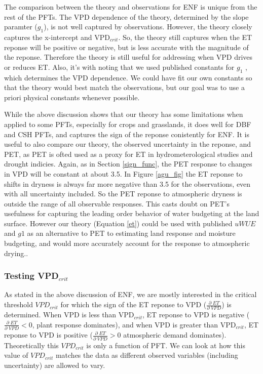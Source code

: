 \documentclass[draft,linenumbers]{agujournal}
\begin{document}
The comparison between the theory and observations for ENF is unique from the rest of the PFTs. The VPD dependence of the theory, determined by the slope paramter ($g_1$), is not well captured by observations. However, the theory closely captures the x-intercept and VPD$_{crit}$. So, the theory still captures when the ET reponse will be positive or negative, but is less accurate with the magnitude of the reponse. Therefore the theory is still useful for addressing when VPD drives or reduces ET. Also, it's with noting that we used published constants for $g_1$ \citep[from ][]{Lin_2015}, which determines the VPD dependence. We could have fit our own constants so that the theory would best match the observations, but our goal was to use a priori physical constants whenever possible.

While the above discussion shows that our theory has some limitations when applied to some PFTs, especially for crops and grasslands, it does well for DBF and CSH PFTs, and captures the sign of the reponse conistently for ENF. It is useful to also compare our theory, the observed uncertainty in the reponse, and PET, as PET is ofted used as a proxy for ET in hydrometerological studies and drought indicies.  Again, as in Section \ref{sign_func}, the PET response to changes in VPD will be constant at about 3.5. In Figure \ref{agu_fig} the ET reponse to shifts in dryness is always far more negative than 3.5 for the observations, even with all uncertainty included. So the PET reponse to atmospheric dryness is outside the range of all observable responses. This casts doubt on PET's usefulness for capturing the leading order behavior of water budgeting at the land surface. However our theory (Equation \ref{et}) could be used with published $uWUE$ and $g1$ as an alternative to PET to estimating land response and moisture budgeting, and would more accurately account for the response to atmospheric drying..

\subsubsection{Testing VPD$_{crit}$}
As stated in the above discussion of ENF, we are mostly interested in the critical threshold $VPD_{crit}$ for which the sign of the ET reponse to VPD ($\frac{\partial \; ET}{\partial \; VPD}$) is determined. When VPD is less than VPD$_{crit}$, ET reponse to VPD is negative ($\frac{\partial \; ET}{\partial \; VPD}  < 0$, plant response dominates), and when VPD is greater than VPD$_{crit}$, ET reponse to VPD is positive  ($\frac{\partial \; ET}{\partial \; VPD} > 0$ atmospheric demand dominates). Theoretically this $VPD_{crit}$ is only a function of PFT. We can look at how this value of $VPD_{crit}$ matches the data as different observed variables (including uncertainty) are allowed to vary.
\end{document}
